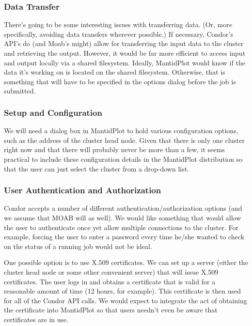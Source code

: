\subsubsection{Data Transfer}
There's going to be some interesting issues with transferring data.  (Or, more specifically, avoiding data transfers wherever possible.)  If necessary, Condor's API's do (and Moab's might) allow for transferring the input data to the cluster and retrieving the output.  However, it would be far more efficient to access input and output locally via a shared filesystem.  Ideally, MantidPlot would know if the data it's working on is located on the shared filesystem.  Otherwise, that is something that will have to be specified in the options dialog before the job is submitted.

\subsubsection{Setup and Configuration}
We will need a dialog box in MantidPlot to hold various configuration options, such as the address of the cluster head node.  Given that there is only one cluster right now and that there will probably never be more than a few, it seems practical to include these configuration details in the MantidPlot distribution so that the user can just select the cluster from a drop-down list.

\subsubsection{User Authentication and Authorization}
Condor accepts a number of different authentication/authorization options (and we assume that MOAB will as well).  We would like something that would allow the user to authenticate once yet allow multiple connections to the cluster.  For example, forcing the user to enter a password every time he/she wanted to check on the status of a running job would not be ideal.

One possible option is to use X.509 certificates.  We can set up a server (either the cluster head node or some other convenient server) that will issue X.509 certificates.  The user logs in and obtains a certificate that is valid for a reasonable amount of time (12 hours, for example).  This certificate is then used for all of the Condor API calls.  We would expect to integrate the act of obtaining the certificate into MantidPlot so that users needn't even be aware that certificates are in use.
